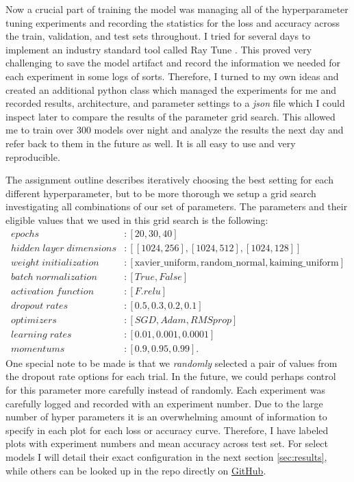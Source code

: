 \documentclass[10pt]{amsart}
\begin{document}
Now a crucial part of training the model was managing all of the hyperparameter tuning experiments and recording the statistics for the loss and accuracy across the train, validation, and test sets throughout.
I tried for several days to implement an industry standard tool called Ray Tune \cite{liaw2018tune}.
This proved very challenging to save the model artifact and record the information we needed for each experiment in some logs of sorts.
Therefore, I turned to my own ideas and created an additional python class which managed the experiments for me and recorded results, architecture, and parameter settings to a \textit{json} file which I could inspect later to compare the results of the parameter grid search.
This allowed me to train over 300 models over night and analyze the results the next day and refer back to them in the future as well.
It is all easy to use and very reproducible.

The assignment outline describes iteratively choosing the best setting for each different hyperparameter, but to be more thorough we setup a grid search investigating all combinations of our set of parameters.
The parameters and their eligible values that we used in this grid search is the following:
\begin{align*}
epochs &: [20, 30, 40] \\
hidden \; layer \; dimensions &: [[1024, 256], [1024, 512], [1024, 128]] \\
weight \; initialization &: [\text{xavier\_uniform}, \text{random\_normal}, \text{kaiming\_uniform}] \\
batch \; normalization &: [True, False] \\
activation \; function &: [F.relu] \\
dropout \; rates &: [0.5, 0.3, 0.2, 0.1] \\
optimizers &: [SGD, Adam, RMSprop] \\
learning \; rates &: [0.01, 0.001, 0.0001] \\
momentums &: [0.9, 0.95, 0.99].
\end{align*}
One special note to be made is that we \textit{randomly} selected a pair of values from the dropout rate options for each trial.
In the future, we could perhaps control for this parameter more carefully instead of randomly.
Each experiment was carefully logged and recorded with an experiment number.
Due to the large number of hyper parameters it is an overwhelming amount of information to specify in each plot for each loss or accuracy curve.
Therefore, I have labeled plots with experiment numbers and mean accuracy across test set.
For select models I will detail their exact configuration in the next section \ref{sec:results}, while others can be looked up in the repo directly on \href{https://github.com/hunter-lybbert/uw-central/blob/main/data_analysis/hw_04/experiments/experiments.json}{GitHub}.
\end{document}
